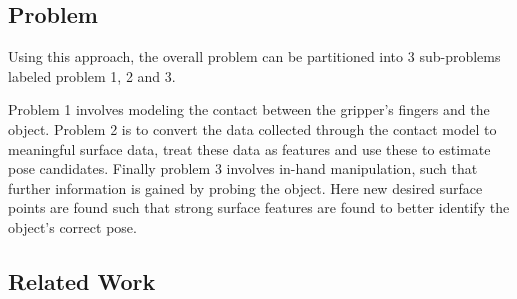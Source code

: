 \documentclass{article}
\begin{document}
\subsection*{Problem}
\label{subsec:problem}

Using this approach, the overall problem can be partitioned into 3 sub-problems labeled problem 1, 2 and 3. \par
Problem 1 involves modeling the contact between the gripper's fingers and the object. Problem 2 is to convert the data collected through the contact model to meaningful surface data, treat these data as features and use these to estimate pose candidates. Finally problem 3 involves in-hand manipulation, such that further information is gained by probing the object. Here new desired surface points are found such that strong surface features are found to better identify the object's correct pose.


\subsection*{Related Work}
\label{related-work}
\end{document}
